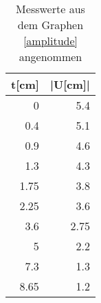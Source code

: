 \begin{table}
\begin{center}
\begin{tabular}{r|r}
t[cm] & |U[cm]| \\
\hline
0 & 5.4 \\
0.4 & 5.1 \\
0.9 & 4.6 \\
1.3 & 4.3 \\
1.75 & 3.8 \\
2.25 & 3.6 \\
3.6 & 2.75 \\
5 & 2.2 \\
7.3 & 1.3 \\
8.65 & 1.2\\
\end{tabular}
\caption[Messwerte zu a]{Messwerte aus dem Graphen \eqref{amplitude} angenommen}
\label{werte_a}
\end{center}
\end{table}
